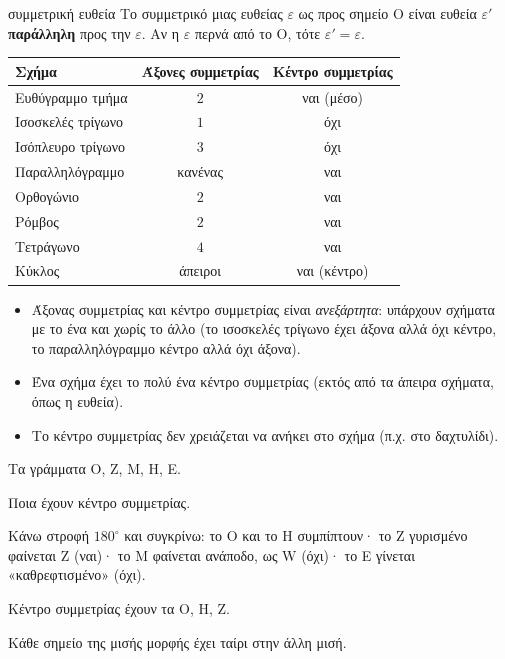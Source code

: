 \begin{kanonas}{συμμετρική ευθεία}
Το συμμετρικό μιας ευθείας $\varepsilon$ ως προς σημείο $\mathrm{Ο}$ είναι ευθεία $\varepsilon'$ \textbf{παράλληλη} προς την $\varepsilon$. Αν η $\varepsilon$ περνά από το $\mathrm{Ο}$, τότε $\varepsilon'=\varepsilon$.
\end{kanonas}

\begin{center}\small
\begin{tabular}{lcc}
\toprule
Σχήμα & Άξονες συμμετρίας & Κέντρο συμμετρίας\\
\midrule
Ευθύγραμμο τμήμα & $2$ & ναι (μέσο)\\
Ισοσκελές τρίγωνο & $1$ & όχι\\
Ισόπλευρο τρίγωνο & $3$ & όχι\\
Παραλληλόγραμμο & κανένας & ναι\\
Ορθογώνιο & $2$ & ναι\\
Ρόμβος & $2$ & ναι\\
Τετράγωνο & $4$ & ναι\\
Κύκλος & άπειροι & ναι (κέντρο)\\
\bottomrule
\end{tabular}
\end{center}

\begin{prosoxi}
\begin{itemize}[leftmargin=1.2em,itemsep=0.3ex,topsep=2pt]
\item Άξονας συμμετρίας και κέντρο συμμετρίας είναι \emph{ανεξάρτητα}: υπάρχουν σχήματα με το ένα και χωρίς το άλλο (το ισοσκελές τρίγωνο έχει άξονα αλλά όχι κέντρο, το παραλληλόγραμμο κέντρο αλλά όχι άξονα).
\item Ένα σχήμα έχει το πολύ ένα κέντρο συμμετρίας (εκτός από τα άπειρα σχήματα, όπως η ευθεία).
\item Το κέντρο συμμετρίας δεν χρειάζεται να ανήκει στο σχήμα (π.χ. στο δαχτυλίδι).
\end{itemize}
\end{prosoxi}


\tixero Τα γράμματα Ο, Ζ, Μ, Η, Ε.\par
\tithelo Ποια έχουν κέντρο συμμετρίας.\par
\possindeo Κάνω στροφή $180^\circ$ και συγκρίνω: το Ο και το Η συμπίπτουν· το Ζ γυρισμένο φαίνεται Ζ (ναι)· το Μ φαίνεται ανάποδο, ως W (όχι)· το Ε γίνεται «καθρεφτισμένο» (όχι).\par
\apantisi Κέντρο συμμετρίας έχουν τα Ο, Η, Ζ.\par
\elegxos Κάθε σημείο της μισής μορφής έχει ταίρι στην άλλη μισή.

